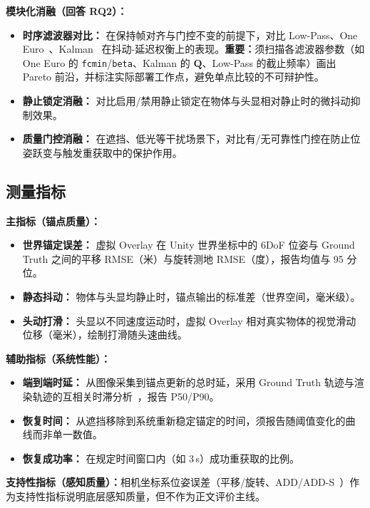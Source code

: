 \documentclass[review]{vgtc}
\begin{document}
\noindent\textbf{模块化消融（回答 RQ2）：}
\begin{itemize}[leftmargin=1.4em]
  \item \textbf{时序滤波器对比：} 在保持帧对齐与门控不变的前提下，对比 Low-Pass、One Euro~\cite{casiez2012oneeuro}、Kalman~\cite{kalman1960new} 在抖动-延迟权衡上的表现。\textbf{重要：}须扫描各滤波器参数（如 One Euro 的 \texttt{fcmin}/\texttt{beta}、Kalman 的 $\mathbf{Q}$、Low-Pass 的截止频率）画出 Pareto 前沿，并标注实际部署工作点，避免单点比较的不可辩护性。
  \item \textbf{静止锁定消融：} 对比启用/禁用静止锁定在物体与头显相对静止时的微抖动抑制效果。
  \item \textbf{质量门控消融：} 在遮挡、低光等干扰场景下，对比有/无可靠性门控在防止位姿跃变与触发重获取中的保护作用。
\end{itemize}

\subsection{测量指标}

\noindent\textbf{主指标（锚点质量）：}
\begin{itemize}[leftmargin=1.4em]
  \item \textbf{世界锚定误差：} 虚拟 Overlay 在 Unity 世界坐标中的 6DoF 位姿与 Ground Truth 之间的平移 RMSE（米）与旋转测地 RMSE（度），报告均值与 95 分位。
  \item \textbf{静态抖动：} 物体与头显均静止时，锚点输出的标准差（世界空间，毫米级）。
  \item \textbf{头动打滑：} 头显以不同速度运动时，虚拟 Overlay 相对真实物体的视觉滑动位移（毫米），绘制打滑随头速曲线。
\end{itemize}

\noindent\textbf{辅助指标（系统性能）：}
\begin{itemize}[leftmargin=1.4em]
  \item \textbf{端到端时延：} 从图像采集到锚点更新的总时延，采用 Ground Truth 轨迹与渲染轨迹的互相关时滞分析~\cite{diluca2010latency}，报告 P50/P90。
  \item \textbf{恢复时间：} 从遮挡移除到系统重新稳定锚定的时间，须报告随阈值变化的曲线而非单一数值。
  \item \textbf{恢复成功率：} 在规定时间窗口内（如 3\,s）成功重获取的比例。
\end{itemize}

\noindent\textbf{支持性指标（感知质量）：}相机坐标系位姿误差（平移/旋转、ADD/ADD-S~\cite{hinterstoisser2012add,posecnn2017}）作为支持性指标说明底层感知质量，但不作为正文评价主线。
\end{document}
